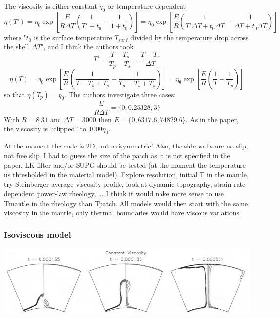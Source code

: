 The viscosity is either constant $\eta_0$ or temperature-dependent 
\[
\eta(T')
=\eta_0 \exp\left[ \frac{E}{R \Delta T} \left( \frac{1}{T'+t_0} -\frac{1}{1+t_0}  \right)   \right]
=\eta_0 \exp\left[ \frac{E}{R} \left( \frac{1}{T' \Delta T  +t_0 \Delta T} -\frac{1}{\Delta T +t_0 \Delta T}  \right)   \right]
\]
where "$t_0$ is the surface temperature $T_{surf}$ divided by the temperature drop across the shell $\Delta T$", and 
I think the authors took 
\[
T'=\frac{T-T_s}{T_p-T_s}= \frac{T-T_s}{\Delta T}
\]
\[
\eta(T)
=\eta_0 \exp\left[ \frac{E}{R} \left( \frac{1}{T-T_s  + T_s} -\frac{1}{T_p-T_s + T_s}  \right)   \right]
=\eta_0 \exp\left[ \frac{E}{R} \left( \frac{1}{T} -\frac{1}{T_p}  \right)   \right]
\]
so that $\eta(T_p)=\eta_0$. 
The authors investigate three cases:
\[
\frac{E}{R \Delta T} = \{0,0.25328,3\}
\]
With $R=8.31$ and $\Delta T=3000$ then $E=\{ 0, 6317.6 , 74829.6 \}$.
As in the paper, the viscosity is ``clipped'' to $1000\eta_0$.

\begin{remark}
At the moment the code is 2D, not axisymmetric! Also, the side walls are no-slip, 
not free slip. I had to guess the size of the patch as it is not specified in the paper.
LK filter and/or SUPG should be tested (at the moment the temperature us thresholded in the 
material model). Explore resolution, initial T in the mantle, try Steinberger average 
viscosity profile, look at dynamic topography, strain-rate dependent power-law rheology, ...
I think it would nake more sense to use Tmantle in the rheology than Tpatch. All models would then start
with the same viscosity in the mantle, only thermal boundaries would have viscous variations.
\end{remark}


\subsubsection*{Isoviscous model}
\begin{center}
\includegraphics[width=15cm]{python_codes/fieldstone_106/images/keki97b}
\end{center}

